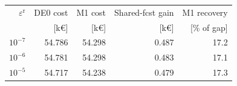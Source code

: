 \begin{tabular*}{\textwidth}{@{\extracolsep{\fill}}rrrrr@{}}
\toprule
$\varepsilon^{\mathrm r}$ & DE0 cost & M1 cost & Shared-fcst gain & M1 recovery \\
 & [k\euro] & [k\euro] & [k\euro] & [\% of gap] \\
\midrule
$10^{-7}$ & 54.786 & 54.298 & 0.487 & 17.2 \\
$10^{-6}$ & 54.781 & 54.298 & 0.483 & 17.1 \\
$10^{-5}$ & 54.717 & 54.238 & 0.479 & 17.3 \\
\bottomrule
\end{tabular*}
